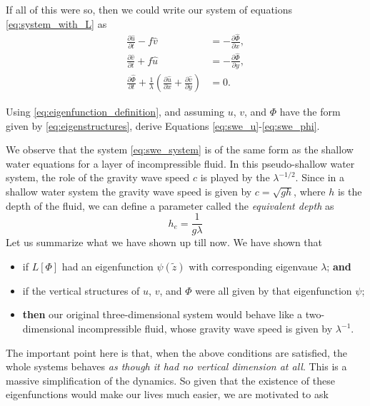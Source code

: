 \documentclass{article}
\numberwithin{equation}{section}
\newcommand{\z}{\tilde{z}}
\begin{document}
%
\shallowwatermarker
If all of this were so, then we could write our system of equations \eqref{eq:system_with_L} as
\begin{subequations}
  \label{eq:swe_system}
\begin{align}
\frac{\partial \hat u}{\partial t} - f \hat v &= -\frac{\partial \hat \Phi}{\partial x}, \label{eq:swe_u} \\
\frac{\partial \hat v}{\partial t} + f \hat u &= -\frac{\partial \hat \Phi}{\partial y}, \label{eq:swe_v} \\
\frac{\partial\hat\Phi}{\partial t} + \frac{1}{\lambda}\left(\frac{\partial \hat u}{\partial x} + \frac{\partial \hat v}{\partial y}\right) &= 0. \label{eq:swe_phi}
\end{align}
\end{subequations}
%
%
\begin{exercise}
Using \eqref{eq:eigenfunction_definition}, and assuming $u$, $v$, and $\Phi$ have the form given by \eqref{eq:eigenstructures}, derive Equations \eqref{eq:swe_u}-\eqref{eq:swe_phi}.
\end{exercise}
%
We observe that the system \eqref{eq:swe_system} is of the same form as the shallow water equations for a layer of incompressible fluid. In this pseudo-shallow water system, the role of the gravity wave speed $c$ is played by the $\lambda^{-1/2}$. Since in a shallow water system the gravity wave speed is given by $c=\sqrt{gh}$, where $h$ is the depth of the fluid, we can define a parameter called the \textit{equivalent depth} as 
\begin{equation}
  \label{eq:equivalent_depth}
  \boxed{
  h_e=\frac{1}{g\lambda}
  }
\end{equation}
%
Let us summarize what we have shown up till now. We have shown that 
\begin{itemize}
\item if $L[\Phi]$ had an eigenfunction $\psi(\z)$ with corresponding eigenvaue $\lambda$; \textbf{and}
\item if the vertical structures of $u$, $v$, and $\Phi$ were all given by that eigenfunction $\psi$;
\item\textbf{then} our original three-dimensional system would behave like a two-dimensional incompressible fluid, whose gravity wave speed is given by $\lambda^{-1}$. 
\end{itemize}
%
\par The important point here is that, when the above conditions are satisfied, the whole systems behaves \textit{as though it had no vertical dimension at all}. This is a massive simplification of the dynamics. So given that the existence of these eigenfunctions would make our lives much easier, we are motivated to ask 
\end{document}
